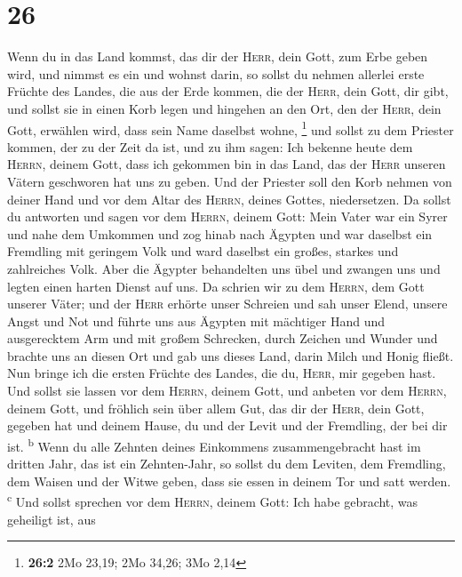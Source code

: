 \hypertarget{section-25}{%
\section{26}\label{section-25}}

 Wenn du in das Land kommst, das dir der \textsc{Herr},
dein Gott, zum Erbe geben wird, und nimmst es ein und wohnst darin,
 so sollst du nehmen allerlei erste Früchte des Landes,
die aus der Erde kommen, die der \textsc{Herr}, dein Gott, dir gibt, und
sollst sie in einen Korb legen und hingehen an den Ort, den der
\textsc{Herr}, dein Gott, erwählen wird, dass sein Name daselbst wohne,
\footnote{\textbf{26:2} 2Mo 23,19; 2Mo 34,26; 3Mo 2,14} 
und sollst zu dem Priester kommen, der zu der Zeit da ist, und zu ihm
sagen: Ich bekenne heute dem \textsc{Herrn}, deinem Gott, dass ich
gekommen bin in das Land, das der \textsc{Herr} unseren Vätern
geschworen hat uns zu geben.  Und der Priester soll den
Korb nehmen von deiner Hand und vor dem Altar des \textsc{Herrn}, deines
Gottes, niedersetzen.  Da sollst du antworten und sagen
vor dem \textsc{Herrn}, deinem Gott: Mein Vater war ein Syrer und nahe
dem Umkommen und zog hinab nach Ägypten und war daselbst ein Fremdling
mit geringem Volk und ward daselbst ein großes, starkes und zahlreiches
Volk.  Aber die Ägypter behandelten uns übel und zwangen
uns und legten einen harten Dienst auf uns.  Da schrien
wir zu dem \textsc{Herrn}, dem Gott unserer Väter; und der \textsc{Herr}
erhörte unser Schreien und sah unser Elend, unsere Angst und Not
 und führte uns aus Ägypten mit mächtiger Hand und
ausgerecktem Arm und mit großem Schrecken, durch Zeichen und Wunder
 und brachte uns an diesen Ort und gab uns dieses Land,
darin Milch und Honig fließt.  Nun bringe ich die ersten
Früchte des Landes, die du, \textsc{Herr}, mir gegeben hast. Und sollst
sie lassen vor dem \textsc{Herrn}, deinem Gott, und anbeten vor dem
\textsc{Herrn}, deinem Gott,  und fröhlich sein über
allem Gut, das dir der \textsc{Herr}, dein Gott, gegeben hat und deinem
Hause, du und der Levit und der Fremdling, der bei dir ist.
\textsuperscript{b}  Wenn du alle Zehnten deines
Einkommens zusammengebracht hast im dritten Jahr, das ist ein
Zehnten-Jahr, so sollst du dem Leviten, dem Fremdling, dem Waisen und
der Witwe geben, dass sie essen in deinem Tor und satt werden.
\textsuperscript{c}  Und sollst sprechen vor dem
\textsc{Herrn}, deinem Gott: Ich habe gebracht, was geheiligt ist, aus

